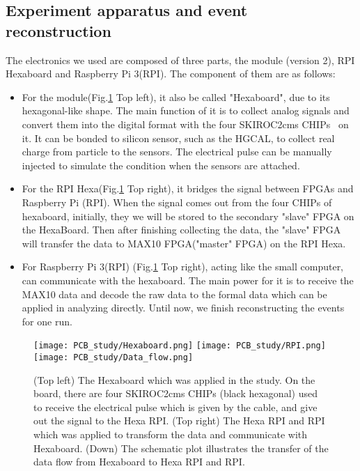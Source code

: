 \documentclass[12pt,twoside,a4paper,an,final]{cms-tdr}
\begin{document}
\subsection{Experiment apparatus and event reconstruction}

The electronics we used are composed of three parts, the module (version 2), RPI Hexaboard and Raspberry Pi 3(RPI). The component of them are as follows:
\begin{itemize}
\item For the module(Fig.\ref{fig:PCB_study_apparatus} Top left), it also be called "Hexaboard", due to its hexagonal-like shape. The main function of it is to collect analog signals and convert them into the digital format with the four SKIROC2cms CHIPs~\cite{Borg_2017} on it. It can be bonded to silicon sensor, such as the HGCAL, to collect real charge from particle to the sensors. The electrical pulse can be manually injected to simulate the condition when the sensors are attached.

\item For the RPI Hexa(Fig.\ref{fig:PCB_study_apparatus} Top right), it bridges the signal between FPGAs and Raspberry Pi (RPI). When the signal comes out from the four CHIPs of hexaboard, initially, they we will be stored to the secondary "slave" FPGA on the HexaBoard. Then after finishing collecting the data, the "slave" FPGA will transfer the data to MAX10 FPGA("master" FPGA) on the RPI Hexa.
\item  For Raspberry Pi 3(RPI) (Fig.\ref{fig:PCB_study_apparatus} Top right), acting like the small computer, can communicate with the hexaboard. The main power for it is to receive the MAX10 data and decode the raw data to the formal data which can be applied in analyzing directly. Until now, we finish reconstructing the events for one run.
\end{itemize}

\begin{figure}[!htb]
\centering
     \texttt{[image: PCB\_study/Hexaboard.png]}
     \texttt{[image: PCB\_study/RPI.png]}\\
     \texttt{[image: PCB\_study/Data\_flow.png]}
\caption{(Top left) The Hexaboard which was applied in the study. On the board, there are four SKIROC2cms CHIPs (black hexagonal) used to receive the electrical pulse which is given by the cable, and give out the signal to the Hexa RPI. (Top right) The Hexa RPI and RPI which was applied to transform the data and communicate with Hexaboard. (Down) The schematic plot illustrates the transfer of the data flow from Hexaboard to Hexa RPI and RPI.
}
\label{fig:PCB_study_apparatus}
\end{figure}
\end{document}
